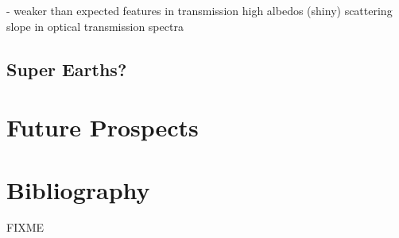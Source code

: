 \documentclass[graybox,natbib,nosecnum]{svmult}
\begin{document}
- weaker than expected features in transmission
high albedos (shiny)
scattering slope in optical transmission spectra

\subsection{Super Earths?}

\section{Future Prospects}

\section{Bibliography}

\begin{acknowledgement}
FIXME
\end{acknowledgement}

\end{document}
